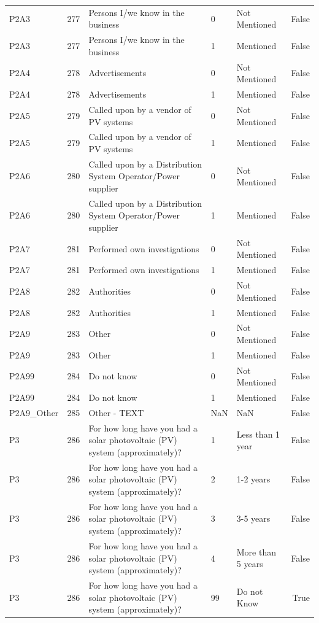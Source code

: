 \begin{tabular}{lrlllr}
P2A3 & 277 & Persons I/we know in the business & 0 & Not Mentioned & False \\
P2A3 & 277 & Persons I/we know in the business & 1 & Mentioned & False \\
P2A4 & 278 & Advertisements & 0 & Not Mentioned & False \\
P2A4 & 278 & Advertisements & 1 & Mentioned & False \\
P2A5 & 279 & Called upon by a vendor of PV systems & 0 & Not Mentioned & False \\
P2A5 & 279 & Called upon by a vendor of PV systems & 1 & Mentioned & False \\
P2A6 & 280 & Called upon by a Distribution System Operator/Power supplier & 0 & Not Mentioned & False \\
P2A6 & 280 & Called upon by a Distribution System Operator/Power supplier & 1 & Mentioned & False \\
P2A7 & 281 & Performed own investigations & 0 & Not Mentioned & False \\
P2A7 & 281 & Performed own investigations & 1 & Mentioned & False \\
P2A8 & 282 & Authorities & 0 & Not Mentioned & False \\
P2A8 & 282 & Authorities & 1 & Mentioned & False \\
P2A9 & 283 & Other & 0 & Not Mentioned & False \\
P2A9 & 283 & Other & 1 & Mentioned & False \\
P2A99 & 284 & Do not know & 0 & Not Mentioned & False \\
P2A99 & 284 & Do not know & 1 & Mentioned & False \\
P2A9_Other & 285 & Other - TEXT & NaN & NaN & False \\
P3 & 286 & For how long have you had a solar photovoltaic (PV) system (approximately)? & 1 & Less than 1 year & False \\
P3 & 286 & For how long have you had a solar photovoltaic (PV) system (approximately)? & 2 & 1-2 years & False \\
P3 & 286 & For how long have you had a solar photovoltaic (PV) system (approximately)? & 3 & 3-5 years & False \\
P3 & 286 & For how long have you had a solar photovoltaic (PV) system (approximately)? & 4 & More than 5 years & False \\
P3 & 286 & For how long have you had a solar photovoltaic (PV) system (approximately)? & 99 & Do not Know & True \\

\end{tabular}
